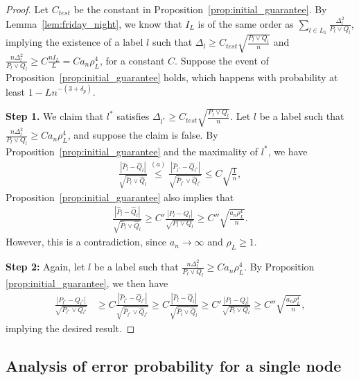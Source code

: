 \documentclass{article}
\begin{document}
\begin{proof}
Let $C_{test}$ be the constant in Proposition~\ref{prop:initial_guarantee}. By Lemma~\ref{lem:friday_night}, we know that  $I_L$ is of the same order as $\sum_{l \in L_1} \frac{\Delta_l^2}{P_l \vee Q_l}$, implying the existence of a label $l$ such that $\Delta_l \geq C_{test} \sqrt{\frac{P_l \vee Q_l}{n}}$ and $\frac{n \Delta_l^2}{P_l \vee Q_l} \geq  C \frac{n I_L}{L} = C a_n \rho^4_L$, for a constant $C$. Suppose the event of Proposition~\ref{prop:initial_guarantee} holds, which happens with probability at least $1 - L n^{-(3+\delta_p)}$. 

\textbf{Step 1.} We claim that $l^*$ satisfies $\Delta_{l^*} \geq C_{test} \sqrt{ \frac{P_l \vee Q_l}{n}} $. Let $l$ be a label such that $\frac{n \Delta_l^2}{P_l \vee Q_l} \geq C a_n \rho^4_L$, and suppose the claim is false. By Proposition~\ref{prop:initial_guarantee} and the maximality of $l^*$, we have
\begin{align*}
\frac{| \hat{P}_l - \hat{Q}_l | }{\sqrt{ \hat{P}_l \vee \hat{Q}_l}} 
\stackrel{(a)}  \leq \frac{| \hat{P}_{l^*} - \hat{Q}_{l^*} | }{\sqrt{ \hat{P}_{l^*} \vee \hat{Q}_{l^*}}} 
         \leq C \sqrt{ \frac{1}{n}},
\end{align*}
Proposition~\ref{prop:initial_guarantee} also implies that
\begin{align*}
\frac{| \hat{P}_l - \hat{Q}_l | }{\sqrt{ \hat{P}_l \vee \hat{Q}_l}} 
  \geq C' \frac{ | P_l - Q_l|}{\sqrt{P_l \vee Q_l}}
   \geq C'' \sqrt{\frac{a_n \rho^4_L}{n}}.
\end{align*}
However, this is a contradiction, since $a_n \rightarrow \infty$ and $\rho_L \geq 1$.

\textbf{Step 2:} Again, let $l$ be a label such that $\frac{n \Delta_l^2}{P_l \vee Q_l} \geq C a_n \rho^4_L$. By Proposition \ref{prop:initial_guarantee}, we then have
\begin{align*}
\frac{ |P_{l^*} - Q_{l^*}|}{\sqrt{ P_{l^*} \vee Q_{l^*}}} &\geq 
C \frac{|\hat{P}_{l^*} - \hat{Q}_{l^*} | }{\sqrt{ \hat{P}_{l^*} \vee \hat{Q}_{l^*} }} 
\geq
C \frac{|\hat{P}_l - \hat{Q}_l | }{\sqrt{ \hat{P}_l \vee \hat{Q}_l}} \geq C' \frac{|P_l - Q_l|}{\sqrt{P_l \vee Q_l}} \geq C'' \sqrt{\frac{a_n \rho^4_L}{n} },
\end{align*}
implying the desired result.
\end{proof}


\subsection{Analysis of error probability for a single node}
\label{appendix: single node}
\end{document}
